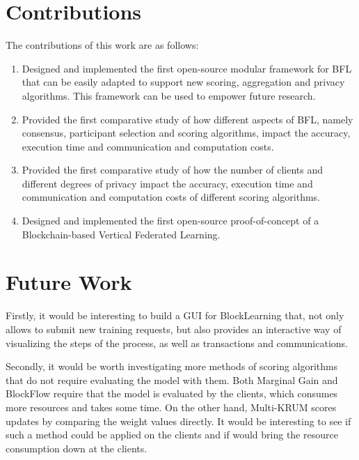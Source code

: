 
\section{Contributions}\label{conclusions:contributions}

The contributions of this work are as follows:

\begin{enumerate}
    \item Designed and implemented the first open-source modular framework for BFL that can be easily adapted to support new scoring, aggregation and privacy algorithms. This framework can be used to empower future research.
    
    \item Provided the first comparative study of how different aspects of BFL, namely consensus, participant selection and scoring algorithms, impact the accuracy, execution time and communication and computation costs.
    
    \item Provided the first comparative study of how the number of clients and different degrees of privacy impact the accuracy, execution time and communication and computation costs of different scoring algorithms.
    
    \item Designed and implemented the first open-source proof-of-concept of a Blockchain-based Vertical Federated Learning.
\end{enumerate}

\section{Future Work}\label{conclusions:future_work}

Firstly, it would be interesting to build a GUI for BlockLearning that, not only allows to submit new training requests, but also provides an interactive way of visualizing the steps of the process, as well as transactions and communications.

Secondly, it would be worth investigating more methods of scoring algorithms that do not require evaluating the model with them. Both Marginal Gain and BlockFlow require that the model is evaluated by the clients, which consumes more resources and takes some time. On the other hand, Multi-KRUM scores updates by comparing the weight values directly. It would be interesting to see if such a method could be applied on the clients and if would bring the resource consumption down at the clients.


